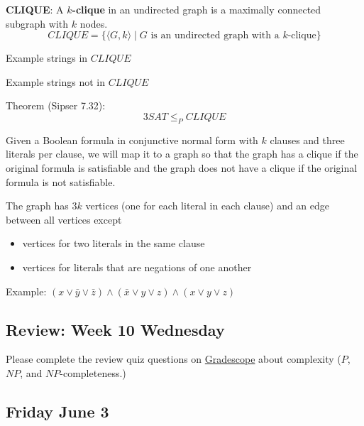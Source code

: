 \documentclass[12pt, oneside]{article}
\begin{document}
{\bf CLIQUE}: A {\bf $k$-clique} in an undirected graph is a maximally connected subgraph with $k$  nodes.
\[
CLIQUE  = \{  \langle G, k \rangle \mid \text{$G$ is an  undirected graph with  a $k$-clique} \}
\]


Example strings  in $CLIQUE$


Example  strings not  in $CLIQUE$


Theorem (Sipser 7.32):
\[
3SAT  \leq_P CLIQUE
\]

Given a Boolean formula in conjunctive normal form with $k$ clauses and three literals per clause, we will 
map it to a graph so that the graph has a clique if the original formula is satisfiable and the 
graph does not have a clique if the original formula is not satisfiable.

The graph has $3k$ vertices (one for each literal in each clause) and an edge between all vertices except
\begin{itemize}
    \item vertices for two literals in the same clause
    \item vertices for literals that are negations of one another
\end{itemize}

Example: $(x \vee \bar{y} \vee {\bar z}) \wedge (\bar{x}  \vee y  \vee  z) \wedge (x \vee y  \vee z)$

\vfill

 
\subsection*{Review: Week 10 Wednesday}

Please complete the review quiz questions on \href{http://gradescope.com}{Gradescope} about 
complexity ($P$, $NP$, and $NP$-completeness.)


\newpage
\subsection*{Friday June 3}
\end{document}

